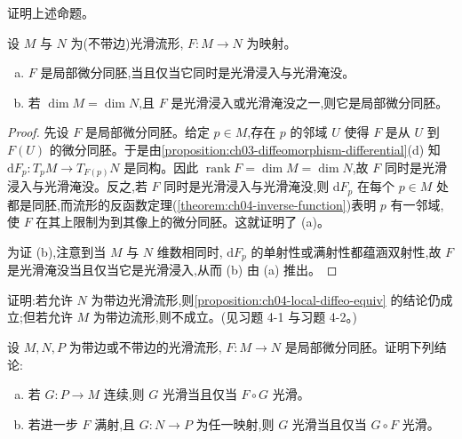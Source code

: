 \documentclass[../../main.tex]{subfiles}
\begin{document}
\begin{exercise}\label{exercise:ch04-prove-local-diffeo-props}
证明上述命题。
\end{exercise}

\begin{proposition}\label{proposition:ch04-local-diffeo-equiv}
设 $M$ 与 $N$ 为(不带边)光滑流形, $F:M\to N$ 为映射。
\begin{enumerate}[(a)]
\item $F$ 是局部微分同胚,当且仅当它同时是光滑浸入与光滑淹没。
\item 若 $\dim M=\dim N$,且 $F$ 是光滑浸入或光滑淹没之一,则它是局部微分同胚。
\end{enumerate}
\end{proposition}

\begin{proof}
先设 $F$ 是局部微分同胚。给定 $p\in M$,存在 $p$ 的邻域 $U$ 使得 $F$ 是从 $U$ 到 $F(U)$ 的微分同胚。于是由\cref{proposition:ch03-diffeomorphism-differential}(d) 知 $\mathrm{d}F_p:T_pM\to T_{F(p)}N$ 是同构。因此 $\operatorname{rank}F=\dim M=\dim N$,故 $F$ 同时是光滑浸入与光滑淹没。反之,若 $F$ 同时是光滑浸入与光滑淹没,则 $\mathrm{d}F_p$ 在每个 $p\in M$ 处都是同胚,而流形的反函数定理(\cref{theorem:ch04-inverse-function})表明 $p$ 有一邻域,使 $F$ 在其上限制为到其像上的微分同胚。这就证明了 (a)。

为证 (b),注意到当 $M$ 与 $N$ 维数相同时, $\mathrm{d}F_p$ 的单射性或满射性都蕴涵双射性,故 $F$ 是光滑淹没当且仅当它是光滑浸入,从而 (b) 由 (a) 推出。
\end{proof}

\begin{exercise}\label{exercise:ch04-local-diffeo-boundary}
证明:若允许 $N$ 为带边光滑流形,则\cref{proposition:ch04-local-diffeo-equiv} 的结论仍成立;但若允许 $M$ 为带边流形,则不成立。(见习题 4-1 与习题 4-2。)
\end{exercise}

\begin{exercise}\label{exercise:ch04-local-diffeo-universal}
设 $M,N,P$ 为带边或不带边的光滑流形, $F:M\to N$ 是局部微分同胚。证明下列结论:
\begin{enumerate}[(a)]
\item 若 $G:P\to M$ 连续,则 $G$ 光滑当且仅当 $F\circ G$ 光滑。
\item 若进一步 $F$ 满射,且 $G:N\to P$ 为任一映射,则 $G$ 光滑当且仅当 $G\circ F$ 光滑。
\end{enumerate}
\end{exercise}
\end{document}
